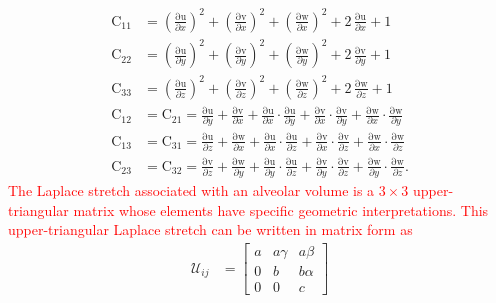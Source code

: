 \begin{subequations}
	\begin{align}	
	\mathrm{C_{11}} & = \left(\frac{\mathrm{\partial u}}{\partial x}\right)^2 + \left(\frac{\mathrm{\partial v}}{\partial x}\right)^2 + \left(\frac{\mathrm{\partial w}}{\partial x}\right)^2 + 2\, \frac{\mathrm{\partial u}}{\partial x}  + 1\\
	\mathrm{C_{22}} & = \left(\frac{\mathrm{\partial u}}{\partial y}\right)^2 + \left(\frac{\mathrm{\partial v}}{\partial y}\right)^2 + \left(\frac{\mathrm{\partial w}}{\partial y}\right)^2 + 2\, \frac{\mathrm{\partial v}}{\partial y} + 1\\
	\mathrm{C_{33}} & = \left(\frac{\mathrm{\partial u}}{\partial z}\right)^2 + \left(\frac{\mathrm{\partial v}}{\partial z}\right)^2 + \left(\frac{\mathrm{\partial w}}{\partial z}\right)^2 + 2\, \frac{\mathrm{\partial w}}{\partial z} + 1 \\
	\mathrm{C_{12}} & = \mathrm{C_{21}} = \frac{\mathrm{\partial u}}{\partial y} + \frac{\mathrm{\partial v}}{\partial x} + \frac{\mathrm{\partial u}}{\partial x} \cdot \frac{\mathrm{\partial u}}{\partial y} + \frac{\mathrm{\partial v}}{\partial x} \cdot \frac{\mathrm{\partial v}}{\partial y} + \frac{\mathrm{\partial w}}{\partial x} \cdot \frac{\mathrm{\partial w}}{\partial y}\\
	\mathrm{C_{13}} & = \mathrm{C_{31}} = \frac{\mathrm{\partial u}}{\partial z} + \frac{\mathrm{\partial w}}{\partial x} + \frac{\mathrm{\partial u}}{\partial x} \cdot \frac{\mathrm{\partial u}}{\partial z} + \frac{\mathrm{\partial v}}{\partial x} \cdot \frac{\mathrm{\partial v}}{\partial z} + \frac{\mathrm{\partial w}}{\partial x} \cdot \frac{\mathrm{\partial w}}{\partial z} \\
	\mathrm{C_{23}} & = \mathrm{C_{32}} = \frac{\mathrm{\partial v}}{\partial z} + \frac{\mathrm{\partial w}}{\partial y} + \frac{\mathrm{\partial u}}{\partial y} \cdot \frac{\mathrm{\partial u}}{\partial z} + \frac{\mathrm{\partial v}}{\partial y} \cdot \frac{\mathrm{\partial v}}{\partial z} + \frac{\mathrm{\partial w}}{\partial y} \cdot \frac{\mathrm{\partial w}}{\partial z}.
	\end{align}
\end{subequations}
\textcolor{red}{The Laplace stretch associated with an alveolar volume is a $3\times3$ upper-triangular matrix whose elements have specific geometric interpretations. This upper-triangular Laplace stretch can be written in matrix form as \cite{FreedSrinivasa15}}
\begin{subequations}
	\label{LagrangianPhysicalStretch}
	\begin{align}
	\mathcal{U}_{ij} & = \begin{bmatrix}
	a & a \gamma & a \beta \\
	0 & b & b \alpha \\
	0 & 0 & c \end{bmatrix} 
	\end{align}
\end{subequations}
